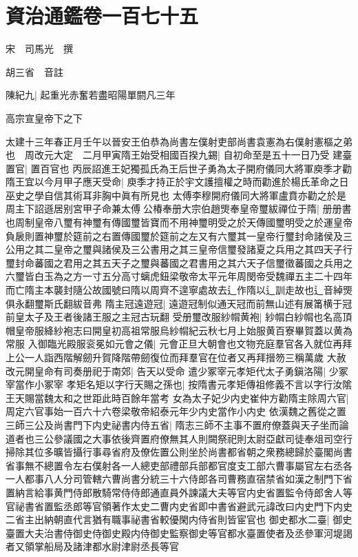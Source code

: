 \chapter{資治通鑑卷一百七十五}
宋　司馬光　撰

胡三省　音註

陳紀九|{
	起重光赤奮若盡昭陽單閼凡三年}


高宗宣皇帝下之下

太建十三年春正月壬午以晉安王伯恭為尚書左僕射吏部尚書袁憲為右僕射憲樞之弟也　周改元大定　二月甲寅隋王始受相國百揆九錫|{
	自初命至是五十一日乃受}
建臺置官|{
	置百官也}
丙辰詔進王妃獨孤氏為王后世子勇為太子開府儀同大將軍庾季才勸隋王宜以今月甲子應天受命|{
	庾季才持正於宇文護擅權之時而勸進於楊氏革命之日巫史之學自信其術耳非胸中眞有所見也}
太傅李穆開府儀同大將軍盧賁亦勸之於是周主下詔遜居别宮甲子命兼太傅公椿奉册大宗伯趙煚奉皇帝璽紱禪位于隋|{
	册册書也周制皇帝八璽有神璽有傳國璽皆寶而不用神璽明受之於天傳國璽明受之於運皇帝負扆則置神璽於筵前之右置傳國璽於筵前之左又有六璽其一皇帝行璽封命諸侯及三公用之其二皇帝之璽與諸侯及三公書用之其三皇帝信璽發諸夏之兵用之其四天子行璽封命蕃國之君用之其五天子之璽與蕃國之君書用之其六天子信璽徵蕃國之兵用之六璽皆白玉為之方一寸五分高寸螭虎鈕梁敬帝太平元年周閔帝受魏禪五主二十四年而亡隋主本襲封隨公故國號曰隋以周齊不遑寧處故去辶作隋以辶訓走故也辶音綽煚俱永翻璽斯氏翻紱音弗}
隋主冠遠遊冠|{
	遠遊冠制似通天冠而前無山述有展筩横于冠前皇太子及王者後諸王服之主冠古玩翻}
受册璽改服紗㡌黄袍|{
	紗㡌白紗㡌也名高頂帽皇帝服絳紗袍志曰開皇初高祖常服烏紗㡌紀云秋七月上始服黄百寮畢賀蓋以黄為常服}
入御臨光殿服衮冕如元會之儀|{
	元會正旦大朝會也文物充庭羣官各入就位再拜上公一人詣西階解劒升賀降階帶劒復位而拜羣官在位者又再拜搢笏三稱萬歲}
大赦改元開皇命有司奏册祀于南郊|{
	告天以受命}
遣少冢宰元孝矩代太子勇鎭洛陽|{
	少冢宰當作小冢宰}
孝矩名矩以字行天賜之孫也|{
	按隋書元孝矩傳祖修義不言以字行汝隂王天賜當魏太和之世距此時百餘年當考}
女為太子妃少内史崔仲方勸隋主除周六官|{
	周定六官事始一百六十六卷梁敬帝紹泰元年少内史當作小内史}
依漢魏之舊從之置三師三公及尚書門下内史祕書内侍五省|{
	隋志三師不主事不置府僚蓋與天子坐而論道者也三公參議國之大事依後齊置府僚無其人則闕祭祀則太尉亞獻司徒奉俎司空行掃除其位多曠皆攝行事尋省府及僚佐置公則坐於尚書都省朝之衆務總歸於臺閣尚書省事無不總置令左右僕射各一人總吏部禮部兵部都官度支工部六曹事屬官左右丞各一人都事八人分司管轄六曹尚書分統三十六侍郎各司曹務直宿禁省如漢之制門下省置納言給事黄門侍郎散騎常侍侍郎通直員外諫議大夫等官内史省置監令侍郎舍人等官祕書省置監丞郎等官領著作太史二曹内史省即中書省避武元諱改曰内史門下内史二省主出納朝直代言猶有職事祕書省較優閑内侍省則皆宦官也}
御史都水二臺|{
	御史臺置大夫治書侍御史侍御史殿内侍御史監察御史等官都水臺置使者及丞參軍河堤謁者又領掌船局及諸津都水尉津尉丞長等官}
